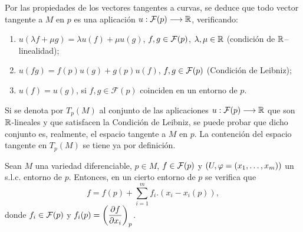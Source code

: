 \documentclass[Cursovd_portada.tex]{subfiles}
\begin{document}
\begin{comment}
Siempre existen curvas diferenciables en $M$ que pasan por $p$. Por ejemplo, la curva constante $\a:\R\fl
M:t\mapsto\a(t)=p$, cuyo vector tangente es $\a'(t)=0$, para todo $t\in\R$.
\par
Por otra parte, si $(U,\vp=(x_1,\dots ,x_m))$ es un s.l.c. entorno de $p$, entonces $\vp(p)=(p_1,\dots
,p_m)\in\vp(U)\subseteq\R^m$. Para cada $i=1,\dots ,m$, sea $\epsilon>0$ tal que
$$(p_1,\dots ,p_{i-1},p_i+t,p_{i+1},\dots ,p_m)\in\vp(U),$$
con $\vert t\vert <\epsilon$, que existe ya que $\vp(U)$ es abierto. Entonces
$$\a_i:(-\epsilon,\epsilon)\fl M:t\mapsto\vp^{-1}((p_1,\dots ,p_{i-1},p_i+t,p_{i+1},\dots ,p_m))$$
es una curva diferenciable en $M$, con $\a_i(0)=p$ y $\a_i'(0)$ es, por tanto, un vector tangente a $M$ en $p$,
que se denotará por:
$$\left(\dep{x_i}\right)_p.$$
\hs Esta notación está justificada porque si $f\in\mathcal{F}(p)$, se tiene que
$$(f\circ\a_i)(t)=(f\circ\vp^{-1})((p_1,\dots ,p_{i-1},p_i+t,p_{i+1},\dots ,p_m))=(f\circ\vp^{-1}\circ h_i)(t),$$
donde $h_i:(-\epsilon,\epsilon)\fl\vp(U):t\mapsto h_i(t)=(p_1,\dots ,p_{i-1},p_i+t,p_{i+1},\dots ,p_m)$. Ahora
bien, $h_i(0)=\vp(p)$ y, por la Regla de la Cadena en espacios euclídeos:
$$\a_i'(0)f=\left.\dderi{(f\circ\a_i)}{t}\right|_{t=0}=(\nabla(f\circ\vp^{-1}))_{h_i(0)}.h'_i(0)=$$
$$=\left(\ddep{(f\circ\vp^{-1})}{u_i}\right)_{\vp(p)}= \left(\ddep{f}{x_i}\right)_p.$$
\hs A partir de ahora, se denotará:
$$\left(\dep{x_i}\right)_pf=\left(\ddep{f}{x_i}\right)_p,\mbox{ }i=1,\dots ,m.$$
\end{comment}
\hs Por las propiedades de los vectores tangentes a curvas, se deduce que todo vector tangente a $M$ en $p$ es una
aplicación $u:\mathcal{F}(p)\longrightarrow\mathbb{R}$, verificando:
\begin{enumerate}
\item $u(\lambda f+\mu g)=\lambda u(f)+\mu u(g)$, $f,g\in{\cal F}(p)$, $\lambda,\mu\in\mathbb{R}$ (condición de
$\mathbb{R}$--linealidad);
\item $u(fg)=f(p)u(g)+g(p)u(f)$, $f,g\in{\cal F}(p)$ (Condición de Leibniz);
\item $u(f)=u(g)$, si $f,g\in\mathcal{F}(p)$ coinciden en un entorno de $p$.
\end{enumerate}
\hs Si se denota por $T_p(M)$ al conjunto de las aplicaciones $u:\mathcal{F}(p)\longrightarrow\mathbb{R}$ que son $\mathbb{R}$-lineales y que
satisfacen la Condición de Leibniz, se puede probar que dicho conjunto es, realmente, el espacio tangente a $M$
en $p$. La contención del espacio tangente en $T_p(M)$ se tiene ya por definición.
\begin{lemma}\label{lema3.1}
Sean $M$ una variedad diferenciable, $p\in M$, $f\in{\cal F}(p)$ y $(U,\varphi=(x_1,\dots ,x_m))$ un s.l.c. entorno de
$p$. Entonces, en un cierto entorno de $p$ se verifica que
$$f=f(p)+\sum_{i=1}^mf_i.(x_i-x_i(p)),$$
donde $f_i\in{\cal F}(p)$ y $f_i(p)=\left(\displaystyle{\frac{\partial f}{\partial x_i}}\right)_p$.
\end{lemma}
\end{document}

